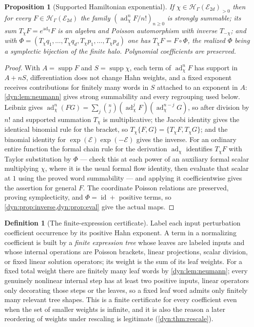 \documentclass[11pt,letterpaper]{article}
\newtheorem{proposition}[proposition]{Proposition}
\theoremstyle{definition}
\newtheorem{definition}[definition]{Definition}
\theoremstyle{remark}
\newcommand{\HH}{\mathscr H}
\newcommand{\EE}{\mathscr E}
\newcommand{\id}{\operatorname{id}}
\newcommand{\supp}{\operatorname{supp}}
\newcommand{\ad}{\operatorname{ad}}
\numberwithin{equation}{section}
\begin{document}
\begin{proposition}[Supported Hamiltonian exponential]\label{dyn:prop:exp}
If $\chi\in\HH_\Gamma(\EE_{2d})_{>0}$ then for every
$F\in\HH_\Gamma(\EE_{2d})$ the family $(\ad_\chi^{n}F/n!)_{n\ge0}$ is
strongly summable; its sum $T_\chi F=e^{\ad_\chi}F$ is an algebra and
Poisson automorphism with inverse $T_{-\chi}$; and with
$\Phi=(T_\chi q_1,\dots,T_\chi q_d,T_\chi p_1,\dots,T_\chi p_d)$ one has
$T_\chi F=F\circ\Phi$, the realized $\Phi$ being a symplectic bijection of
the finite halo. Polynomial coefficients are preserved.
\end{proposition}
\begin{proof}
With $A=\supp F$ and $S=\supp\chi$, each term of $\ad_\chi^{n}F$ has
support in $A+nS$, differentiation does not change Hahn weights, and a
fixed exponent receives contributions for finitely many words in $S$
attached to an exponent in $A$: \cref{dyn:lem:neumann} gives strong
summability and every regrouping used below. Leibniz gives
$\ad_\chi^{n}(FG)=\sum_j\binom nj(\ad_\chi^{j}F)(\ad_\chi^{n-j}G)$, so
after division by $n!$ and supported summation $T_\chi$ is multiplicative;
the Jacobi identity gives the identical binomial rule for the bracket, so
$T_\chi\{F,G\}=\{T_\chi F,T_\chi G\}$; and the binomial identity for
$\exp(\mathscr E)\exp(-\mathscr E)$ gives the inverse. For an ordinary
entire function the formal chain rule for the derivation $\ad_\chi$
identifies $T_\chi F$ with Taylor substitution by $\Phi$ --- check this at
each power of an auxiliary formal scalar multiplying $\chi$, where it is
the usual formal flow identity, then evaluate that scalar at $1$ using the
proved word summability --- and applying it coefficientwise gives the
assertion for general $F$. The coordinate Poisson relations are preserved,
proving symplecticity, and $\Phi=\id+$ positive terms, so
\cref{dyn:prop:inverse,dyn:prop:eval} give the actual maps.
\end{proof}

\begin{definition}[The finite-expression certificate]\label{dyn:def:trees}
Label each input perturbation coefficient occurrence by its positive Hahn
exponent. A term in a normalizing coefficient is built by a \emph{finite
expression tree} whose leaves are labeled inputs and whose internal
operations are Poisson brackets, linear projections, scalar division, or
fixed linear solution operators; its weight is the sum of its leaf weights.
For a fixed total weight there are finitely many leaf words by
\cref{dyn:lem:neumann}; every genuinely nonlinear internal step has at
least two positive inputs, linear operators only decorating those steps or
the leaves, so a fixed leaf word admits only finitely many relevant tree
shapes. This is a finite certificate for every coefficient even when the
set of smaller weights is infinite, and it is also the reason a later
reordering of weights under rescaling is legitimate
(\cref{dyn:thm:rescale}).
\end{definition}
\end{document}
